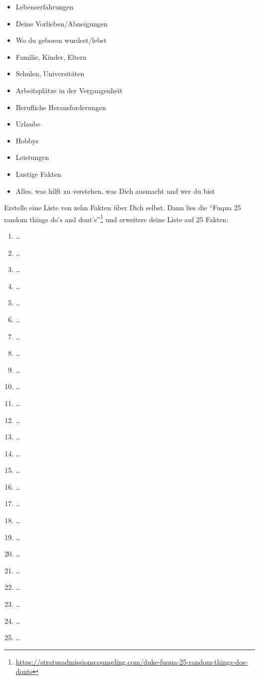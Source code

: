 \documentclass[
  ngerman,
  paper=a4,
,captions=tableheading
]{scrartcl}
\DeclareRobustCommand{\href}[2]{#2\footnote{\url{#1}}}
\providecommand{\tightlist}{%
  \setlength{\itemsep}{0pt}\setlength{\parskip}{0pt}}
\begin{document}
\begin{itemize}
\tightlist
\item
  Lebenserfahrungen
\item
  Deine Vorlieben/Abneigungen
\item
  Wo du geboren wurdest/lebst
\item
  Familie, Kinder, Eltern
\item
  Schulen, Universitäten
\item
  Arbeitsplätze in der Vergangenheit
\item
  Berufliche Herausforderungen
\item
  Urlaube
\item
  Hobbys
\item
  Leistungen
\item
  Lustige Fakten
\item
  Alles, was hilft zu verstehen, was Dich ausmacht und wer du bist
\end{itemize}

Erstelle eine Liste von zehn Fakten über Dich selbst. Dann lies die
\href{https://stratusadmissionscounseling.com/duke-fuqua-25-random-things-dos-donts}{``Fuqua
25 random things do's and dont's''} und erweitere deine Liste auf 25
Fakten:

\begin{enumerate}
\def\labelenumi{\arabic{enumi}.}
\tightlist
\item
  \ldots{}
\item
  \ldots{}
\item
  \ldots{}
\item
  \ldots{}
\item
  \ldots{}
\item
  \ldots{}
\item
  \ldots{}
\item
  \ldots{}
\item
  \ldots{}
\item
  \ldots{}
\item
  \ldots{}
\item
  \ldots{}
\item
  \ldots{}
\item
  \ldots{}
\item
  \ldots{}
\item
  \ldots{}
\item
  \ldots{}
\item
  \ldots{}
\item
  \ldots{}
\item
  \ldots{}
\item
  \ldots{}
\item
  \ldots{}
\item
  \ldots{}
\item
  \ldots{}
\item
  \ldots{}
\end{enumerate}
\end{document}
